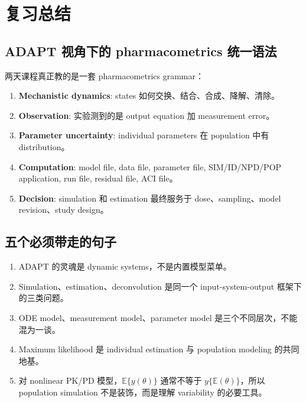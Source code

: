 \documentclass[a4paper]{article}
\newcommand{\concept}[1]{\textbf{#1}}
\begin{document}
\section{复习总结}

\subsection{ADAPT 视角下的 pharmacometrics 统一语法}

两天课程真正教的是一套 pharmacometrics grammar：

\begin{enumerate}
  \item \concept{Mechanistic dynamics}: states 如何交换、结合、合成、降解、清除。
  \item \concept{Observation}: 实验测到的是 output equation 加 measurement error。
  \item \concept{Parameter uncertainty}: individual parameters 在 population 中有 distribution。
  \item \concept{Computation}: model file, data file, parameter file, SIM/ID/NPD/POP application, run file, residual file, ACI file。
  \item \concept{Decision}: simulation 和 estimation 最终服务于 dose、sampling、model revision、study design。
\end{enumerate}

\subsection{五个必须带走的句子}

\begin{enumerate}
  \item ADAPT 的灵魂是 dynamic systems，不是内置模型菜单。
  \item Simulation、estimation、deconvolution 是同一个 input-system-output 框架下的三类问题。
  \item ODE model、measurement model、parameter model 是三个不同层次，不能混为一谈。
  \item Maximum likelihood 是 individual estimation 与 population modeling 的共同地基。
  \item 对 nonlinear PK/PD 模型，\(\mathbb{E}\{y(\theta)\}\) 通常不等于 \(y\{\mathbb{E}(\theta)\}\)，所以 population simulation 不是装饰，而是理解 variability 的必要工具。
\end{enumerate}
\end{document}
